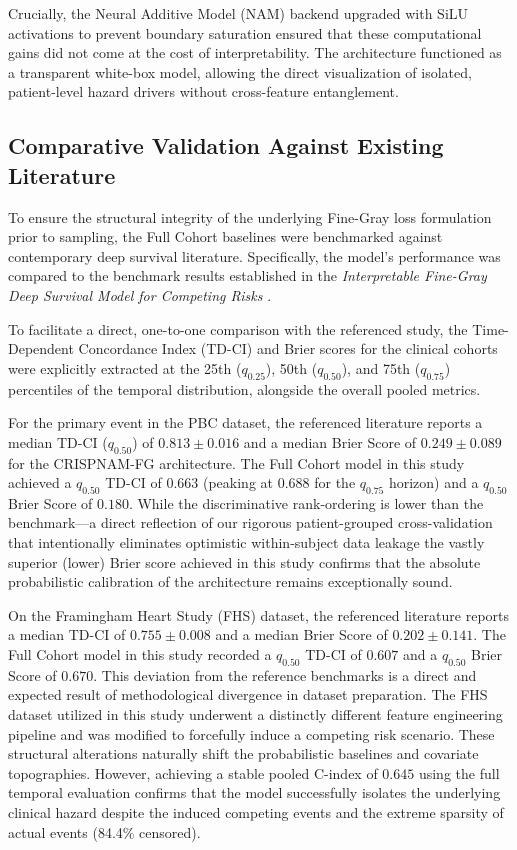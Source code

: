 \documentclass[a4paper,twoside,12pt]{report}
\begin{document}
Crucially, the Neural Additive Model (NAM) backend upgraded with SiLU activations to prevent boundary saturation ensured that these computational gains did not come at the cost of interpretability. The architecture functioned as a transparent white-box model, allowing the direct visualization of isolated, patient-level hazard drivers without cross-feature entanglement.

\subsection{Comparative Validation Against Existing Literature}

To ensure the structural integrity of the underlying Fine-Gray loss formulation prior to sampling, the Full Cohort baselines were benchmarked against contemporary deep survival literature. Specifically, the model's performance was compared to the benchmark results established in the \textit{Interpretable Fine-Gray Deep Survival Model for Competing Risks} \citep{InterpretableFineGray2025}. 

To facilitate a direct, one-to-one comparison with the referenced study, the Time-Dependent Concordance Index (TD-CI) and Brier scores for the clinical cohorts were explicitly extracted at the 25th ($q_{0.25}$), 50th ($q_{0.50}$), and 75th ($q_{0.75}$) percentiles of the temporal distribution, alongside the overall pooled metrics.

For the primary event in the PBC dataset, the referenced literature reports a median TD-CI ($q_{0.50}$) of $0.813 \pm 0.016$ and a median Brier Score of $0.249 \pm 0.089$ for the CRISPNAM-FG architecture. The Full Cohort model in this study achieved a $q_{0.50}$ TD-CI of $0.663$ (peaking at $0.688$ for the $q_{0.75}$ horizon) and a $q_{0.50}$ Brier Score of $0.180$. While the discriminative rank-ordering is lower than the benchmark—a direct reflection of our rigorous patient-grouped cross-validation that intentionally eliminates optimistic within-subject data leakage the vastly superior (lower) Brier score achieved in this study confirms that the absolute probabilistic calibration of the architecture remains exceptionally sound.

On the Framingham Heart Study (FHS) dataset, the referenced literature reports a median TD-CI of $0.755 \pm 0.008$ and a median Brier Score of $0.202 \pm 0.141$. The Full Cohort model in this study recorded a $q_{0.50}$ TD-CI of $0.607$ and a $q_{0.50}$ Brier Score of $0.670$. This deviation from the reference benchmarks is a direct and expected result of methodological divergence in dataset preparation. The FHS dataset utilized in this study underwent a distinctly different feature engineering pipeline and was modified to forcefully induce a competing risk scenario. These structural alterations naturally shift the probabilistic baselines and covariate topographies. However, achieving a stable pooled C-index of $0.645$ using the full temporal evaluation confirms that the model successfully isolates the underlying clinical hazard despite the induced competing events and the extreme sparsity of actual events (84.4\% censored).
\end{document}
